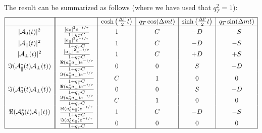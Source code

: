 \documentclass[a4paper,9pt,twoside]{article}
\begin{document}
The result can be summarized as follows (where we have used that $q_T^2=1$):
\begin{equation}
\begin{array}{|c|| c | c | c | c | c |}
 \hline
                                             &                          &  \cosh\left(\frac{\Delta\Gamma}{2}t\right) & q_T \cos(\Delta m t)  & \sinh\left(\frac{\Delta\Gamma}{2}t\right) &q_T\sin(\Delta m t)  \\
 \hline
|{\cal A}_0(t)|^2                           &\frac{  | a_0 |^2 e^{-t/\tau}}{1+q_TC}                  & 1 &   C  &  -D & -S   \\
|{\cal A}_\parallel(t)|^2                   &\frac{  | a_\parallel |^2 e^{-t/\tau}}{1+q_TC}          & 1 &   C  &  -D & -S   \\
|{\cal A}_\perp(t)|^2                       &\frac{  | a_\perp |^2 e^{-t/\tau}}{1+q_TC}              & 1 &   C  &  +D & +S   \\
\Im({\cal A}_\parallel^*(t){\cal A}_\perp(t)) &\frac{  \Re(a_\parallel^* a_\perp)e^{-t/\tau}}{1+q_TC}& 0 &   0  &   S & -D   \\                         
                                            &\frac{  \Im(a_\parallel^* a_\perp)e^{-t/\tau}}{1+q_TC}  & C &   1  &   0 &  0   \\
\Im({\cal A}_0^*(t){\cal A}_\perp(t))         &\frac{  \Re(a_0^* a_\perp)e^{-t/\tau}}{1+q_TC}        & 0 &   0  &   S & -D   \\
                                            &\frac{  \Im(a_0^* a_\perp)e^{-t/\tau}}{1+q_TC}          & C &   1  &   0 &  0   \\
\Re({\cal A}_0^*(t){\cal A}_\parallel(t))     &\frac{  \Re(a_0^*a_\parallel)e^{-t/\tau}}{1+q_TC}     & 1 &   C  &  -D & -S   \\
                                            &\frac{  \Im(a_0^*a_\parallel)e^{-t/\tau}}{1+q_TC}       & 0 &   0  &   0 &  0   \\
\hline
\end{array}
\end{equation}
\end{document}
